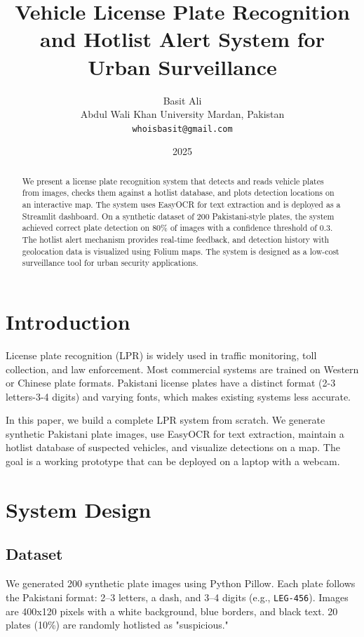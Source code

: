 \documentclass[11pt,a4paper]{article}
\title{\textbf{Vehicle License Plate Recognition and Hotlist Alert System for Urban Surveillance}}
\author{Basit Ali \\
Abdul Wali Khan University Mardan, Pakistan \\
\texttt{whoisbasit@gmail.com}}
\date{2025}
\begin{document}
\maketitle

\begin{abstract}
We present a license plate recognition system that detects and reads vehicle plates from images, checks them against a hotlist database, and plots detection locations on an interactive map. The system uses EasyOCR for text extraction and is deployed as a Streamlit dashboard. On a synthetic dataset of 200 Pakistani-style plates, the system achieved correct plate detection on 80\% of images with a confidence threshold of 0.3. The hotlist alert mechanism provides real-time feedback, and detection history with geolocation data is visualized using Folium maps. The system is designed as a low-cost surveillance tool for urban security applications.
\end{abstract}

\section{Introduction}

License plate recognition (LPR) is widely used in traffic monitoring, toll collection, and law enforcement. Most commercial systems are trained on Western or Chinese plate formats. Pakistani license plates have a distinct format ({2-3 letters}-{3-4 digits}) and varying fonts, which makes existing systems less accurate.

In this paper, we build a complete LPR system from scratch. We generate synthetic Pakistani plate images, use EasyOCR for text extraction, maintain a hotlist database of suspected vehicles, and visualize detections on a map. The goal is a working prototype that can be deployed on a laptop with a webcam.

\section{System Design}

\subsection{Dataset}

We generated 200 synthetic plate images using Python Pillow. Each plate follows the Pakistani format: 2--3 letters, a dash, and 3--4 digits (e.g., \texttt{LEG-456}). Images are 400x120 pixels with a white background, blue borders, and black text. 20 plates (10\%) are randomly hotlisted as "suspicious."
\end{document}
